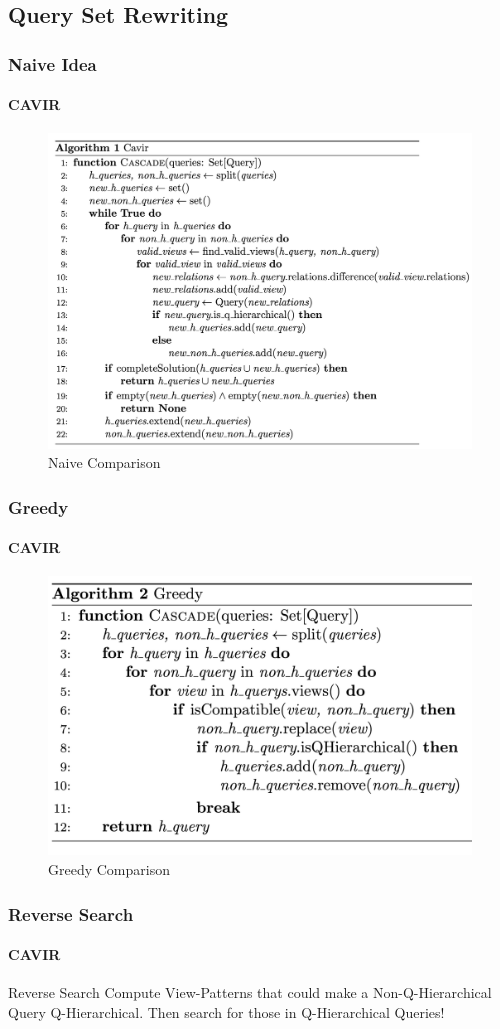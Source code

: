 \documentclass[
	11pt, %
]{beamer}
\begin{document}
\subsection{Query Set Rewriting}
\begin{frame}
	\frametitle{Naive Idea}
	\framesubtitle{CAVIR}
	\begin{figure}
		\includegraphics[height=0.7\textheight]{Naive.png}
		\caption{Naive Comparison}
	\end{figure}
\end{frame}
\begin{frame}
	\frametitle{Greedy}
	\framesubtitle{CAVIR}
		\begin{figure}
		\includegraphics[height=0.7\textheight]{Greedy.png}
		\caption{Greedy Comparison}
	\end{figure}
\end{frame}
\begin{frame}
	\frametitle{Reverse Search}
	\framesubtitle{CAVIR}
	\begin{block}{Reverse Search}
		Compute View-Patterns that could make a Non-Q-Hierarchical Query Q-Hierarchical. Then search for those in Q-Hierarchical Queries!
	\end{block}
\end{frame}
\end{document}
